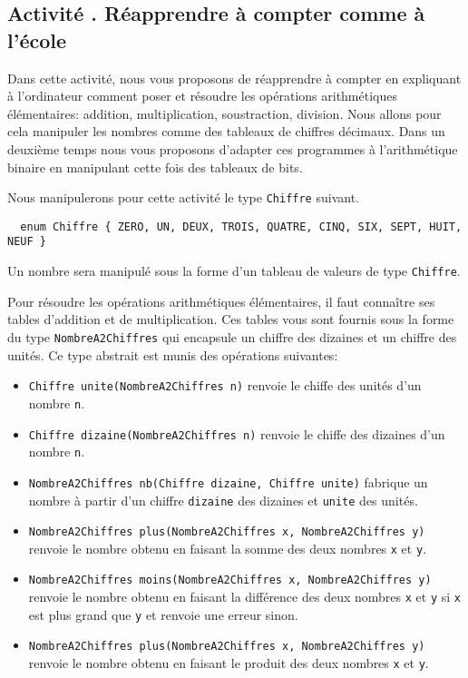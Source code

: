 \documentclass[a4paper,11pt]{article}
\newcounter{activite}%
\def\theactivite{\Roman{activite}}%
\newenvironment{activite}[1]%
{\refstepcounter{activite}
\subsection*{Activité \theactivite. #1}}%
{}
\def\|{\lstinline|}%
\begin{document}
\begin{activite}{Réapprendre à compter comme à l'école}

  Dans cette activité, nous vous proposons de réapprendre à compter en
  expliquant à l'ordinateur comment poser et résoudre les opérations
  arithmétiques élémentaires: addition, multiplication, soustraction,
  division. Nous allons pour cela manipuler les nombres comme des
  tableaux de chiffres décimaux. Dans un deuxième temps nous vous
  proposons d'adapter ces programmes à l'arithmétique binaire en
  manipulant cette fois des tableaux de bits.

  Nous manipulerons pour cette activité le type \|Chiffre| suivant.
\begin{lstlisting}
  enum Chiffre { ZERO, UN, DEUX, TROIS, QUATRE, CINQ, SIX, SEPT, HUIT, NEUF }
\end{lstlisting}
Un nombre sera manipulé sous la forme d'un tableau de valeurs de type
\|Chiffre|.

Pour résoudre les opérations arithmétiques élémentaires, il faut
connaître ses tables d'addition et de multiplication.  Ces tables vous
sont fournis sous la forme du type \|NombreA2Chiffres| qui
encapsule un chiffre des dizaines et un chiffre des unités. Ce type
abstrait est munis des opérations suivantes:
\begin{itemize}

\item \|Chiffre unite(NombreA2Chiffres n)| renvoie le chiffe des
  unités d'un nombre \|n|.

\item \|Chiffre dizaine(NombreA2Chiffres n)| renvoie le chiffe des
  dizaines d'un nombre \|n|.

\item \|NombreA2Chiffres nb(Chiffre dizaine, Chiffre unite)| fabrique
  un nombre à partir d'un chiffre \|dizaine| des dizaines et \|unite|
  des unités.

\item \|NombreA2Chiffres plus(NombreA2Chiffres x, NombreA2Chiffres y)|
  renvoie le nombre obtenu en faisant la somme des deux nombres \|x|
  et \|y|.

\item \|NombreA2Chiffres moins(NombreA2Chiffres x, NombreA2Chiffres y)| 
  renvoie le nombre obtenu en faisant la différence des deux
  nombres \|x| et \|y| si \|x| est plus grand que \|y| et renvoie une
  erreur sinon.

\item \|NombreA2Chiffres plus(NombreA2Chiffres x, NombreA2Chiffres y)|
  renvoie le nombre obtenu en faisant le produit des deux nombres
  \|x| et \|y|.


\end{itemize}
\end{activite}
\end{document}
